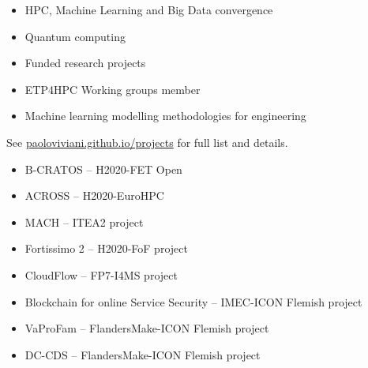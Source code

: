 \documentclass[10pt,a4paper]{altacv}
\begin{document}

\begin{itemize}
\item HPC, Machine Learning and Big Data convergence
\item Quantum computing
\item Funded research projects
\item ETP4HPC Working groups member
\end{itemize}

\divider

\begin{itemize}
\item Machine learning modelling methodologies for engineering
\end{itemize}

\divider 

See \href{http://paoloviviani.github.io/projects}{\color{accent}paoloviviani.github.io/projects} for full list and details.
\medskip
\begin{itemize}
\item B-CRATOS -- H2020-FET Open
\item ACROSS -- H2020-EuroHPC
\item MACH -- ITEA2 project
\item Fortissimo 2 -- H2020-FoF project
\item CloudFlow -- FP7-I4MS project
\item Blockchain for online Service Security -- IMEC-ICON Flemish project
\item VaProFam -- FlandersMake-ICON Flemish project
\item DC-CDS -- FlandersMake-ICON Flemish project
\end{itemize}
\end{document}
